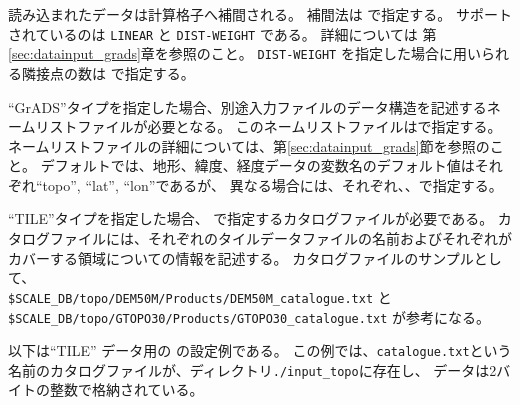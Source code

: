 読み込まれたデータは計算格子へ補間される。
補間法は  で指定する。
サポートされているのは \verb|LINEAR| と \verb|DIST-WEIGHT| である。
詳細については 第\ref{sec:datainput_grads}章を参照のこと。
\verb|DIST-WEIGHT| を指定した場合に用いられる隣接点の数は  で指定する。



``GrADS''タイプを指定した場合、別途入力ファイルのデータ構造を記述するネームリストファイルが必要となる。
このネームリストファイルはで指定する。
ネームリストファイルの詳細については、第\ref{sec:datainput_grads}節を参照のこと。
デフォルトでは、地形、緯度、経度データの変数名のデフォルト値はそれぞれ``topo'', ``lat'', ``lon''であるが、
異なる場合には、それぞれ、、で指定する。


``TILE''タイプを指定した場合、 で指定するカタログファイルが必要である。
カタログファイルには、それぞれのタイルデータファイルの名前およびそれぞれがカバーする領域についての情報を記述する。
カタログファイルのサンプルとして、\\ \verb|$SCALE_DB/topo/DEM50M/Products/DEM50M_catalogue.txt| と\\
\verb|$SCALE_DB/topo/GTOPO30/Products/GTOPO30_catalogue.txt| が参考になる。

以下は``TILE'' データ用の  の設定例である。
この例では、\verb|catalogue.txt|という名前のカタログファイルが、ディレクトリ\verb|./input_topo|に存在し、
データは2バイトの整数で格納されている。

